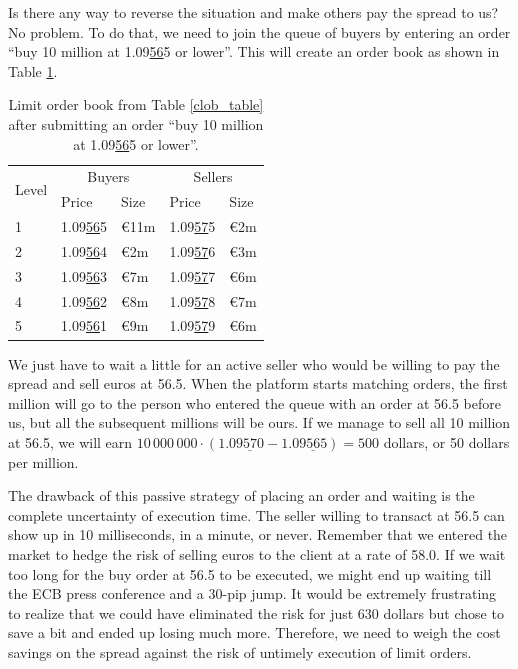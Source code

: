\documentclass[a4paper,14pt]{extarticle}
\begin{document}
Is there any way to reverse the situation and make others pay the spread to us? 
No problem. To do that, we need to join the queue of buyers by entering 
an order ``buy 10 million at 1.09\underline{56}5 or lower''. This will 
create an order book as shown in Table \ref{clob_table_3}.

\begin{table}[h]
\centering
\begin{tabular}{l|l|l|l|l}
\multirow{2}{*}{Level} & \multicolumn{2}{c|}{Buyers} &
\multicolumn{2}{c}{Sellers} \\ \cline{2-5}
& Price & Size & Price & Size \\ \hline
1 & 1.09\underline{56}5 & \euro11m & 1.09\underline{57}5 & \euro2m \\
2 & 1.09\underline{56}4 & \euro2m  & 1.09\underline{57}6 & \euro3m \\
3 & 1.09\underline{56}3 & \euro7m  & 1.09\underline{57}7 & \euro6m \\
4 & 1.09\underline{56}2 & \euro8m  & 1.09\underline{57}8 & \euro7m \\
5 & 1.09\underline{56}1 & \euro9m  & 1.09\underline{57}9 & \euro6m
\end{tabular}
\caption{Limit order book from Table \ref{clob_table} after submitting an order 
``buy 10 million at 1.09\underline{56}5 or lower''.}
\label{clob_table_3}
\end{table}

We just have to wait a little for an active seller who would be willing 
to pay the spread and sell euros at 56.5. When the platform starts matching 
orders, the first million will go to the person who entered the queue with an 
order at 56.5 before us, but all the subsequent millions will be ours. If we 
manage to sell all 10 million at 56.5, we will earn $10\,000\,000 \cdot 
(1.09\underline{57}0 - 1.09\underline{56}5) = 500$ dollars, or 50 dollars per 
million.

The drawback of this passive strategy of placing an order and waiting is the 
complete uncertainty of execution time. The seller willing to transact at 56.5 
can show up in 10 milliseconds, in a minute, or never. Remember that we entered 
the market to hedge the risk of selling euros to the client at a rate of 58.0. 
If we wait too long for the buy order at 56.5 to be executed, we might end up 
waiting till the ECB press conference and a 30-pip jump. It would 
be extremely frustrating to realize that we could have eliminated the risk for 
just 630 dollars but chose to save a bit and ended up losing much more. 
Therefore, we need to weigh the cost savings on the spread against the risk of 
untimely execution of limit orders.
\end{document}
